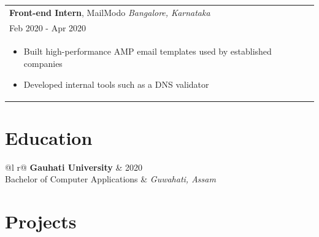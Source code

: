 \documentclass[a4paper,8pt]{article}
\begin{document}
\begin{tabularx}{\linewidth}{ @{}l r@{} }
\large\textbf{Front-end Intern}, MailModo \hfill \color[HTML]{4B28A4} \normalsize\textit{Bangalore, Karnataka} \\[4pt]
\large{Feb 2020 - Apr 2020} \hfill \\[4pt]
\begin{minipage}[t]{\linewidth}
    \begin{itemize}[nosep,after=\strut, leftmargin=2em, itemsep=2pt]
        \item Built high-performance AMP email templates used by established companies
        \item Developed internal tools such as a DNS validator
    \end{itemize}
\end{minipage}
\end{tabularx}


\section{\textbf{Education}}
\begin{tabularx}{\linewidth}{ @{}l r@{} }
\large\textbf{Gauhati University} & \hfill 2020 \\
\large{Bachelor of Computer Applications} {} & \hfill \color[HTML]{4B28A4} \textit{Guwahati, Assam} \\
\end{tabularx}

\section{\textbf{Projects}}

\end{document}
